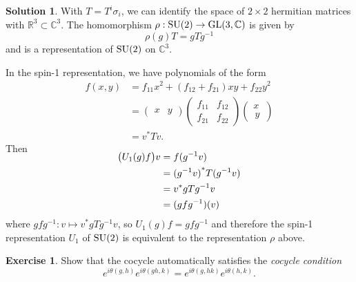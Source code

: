 \documentclass[11pt, a4paper]{report}
\theoremstyle{definition}
\newtheorem{exercise}{Exercise}[part]
\newtheorem{solution}{Solution}[part]
\newenvironment{ex}{\begin{exercise}}{\end{exercise}\pagebreak[1]}
\newenvironment{sol}{\begin{solution}}{\end{solution}\pagebreak[3]}
\newcommand*{\GL}{\ensuremath\text{GL}}
\newcommand*{\SU}{\ensuremath\text{SU}}
\begin{document}
\begin{sol}

With $T = T^i\sigma_i$, we can identify the space of $2 \times 2$ hermitian matrices with $\mathbb{R}^3 \subset \mathbb{C}^3$.
The homomorphism $\rho: \SU(2) \to \GL(3, \mathbb{C})$ is given by
\[
    \rho(g) T = g T g^{-1}
\]
and is a representation of $\SU(2)$ on $\mathbb{C}^3$.

In the spin-1 representation, we have polynomials of the form
\begin{align*}
    f(x, y) &= f_{11} x^2 + (f_{12} + f_{21}) xy + f_{22} y^2 \\
            &= \begin{pmatrix}
                    x & y
               \end{pmatrix}
               \begin{pmatrix}
                    f_{11} & f_{12} \\
                    f_{21} & f_{22}
               \end{pmatrix}
               \begin{pmatrix}
                    x \\ \, y \,
               \end{pmatrix} \\
            &= v^* T v.
\end{align*}
Then
\begin{align*}
    \SwapAboveDisplaySkip
    \bigl(U_1(g) f \bigr) v &= f(g^{-1} v) \\
                            &= {(g^{-1} v)}^* T (g^{-1} v) \\
                            &= v^* g T g^{-1} v \\
                            &= (gfg^{-1}) (v)
\end{align*}
where $gfg^{-1}: v \mapsto v^* gTg^{-1} v$,
so $U_1(g) f = gfg^{-1}$ and therefore the spin-1 representation $U_1$ of $\SU(2)$ is equivalent to the representation $\rho$ above.

\end{sol}

\begin{ex}

Show that the cocycle automatically satisfies the \emph{cocycle condition}
\[
    e^{i\theta(g, h)} e^{i\theta(gh, k)} = e^{i\theta(g, hk)} e^{i\theta(h, k)}.
\]

\end{ex}
\end{document}
